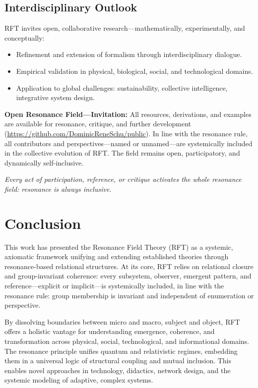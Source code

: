 \documentclass[12pt]{article}
\begin{document}
	\subsection{Interdisciplinary Outlook}
	
	RFT invites open, collaborative research—mathematically, experimentally, and conceptually:
	\begin{itemize}
		\item Refinement and extension of formalism through interdisciplinary dialogue.
		\item Empirical validation in physical, biological, social, and technological domains.
		\item Application to global challenges: sustainability, collective intelligence, integrative system design.
	\end{itemize}
	
	\medskip
	
	\textbf{Open Resonance Field—Invitation:}  
	All resources, derivations, and examples are available for resonance, critique, and further development (\url{https://github.com/DominicReneSchu/public}). In line with the resonance rule, all contributors and perspectives—named or unnamed—are systemically included in the collective evolution of RFT. The field remains open, participatory, and dynamically self-inclusive.
	
	\medskip
	
	\textit{Every act of participation, reference, or critique activates the whole resonance field: resonance is always inclusive.}


	
	\section{Conclusion}
	
	This work has presented the Resonance Field Theory (RFT) as a systemic, axiomatic framework unifying and extending established theories through resonance-based relational structures. At its core, RFT relies on relational closure and group-invariant coherence: every subsystem, observer, emergent pattern, and reference—explicit or implicit—is systemically included, in line with the resonance rule: group membership is invariant and independent of enumeration or perspective.
	
	By dissolving boundaries between micro and macro, subject and object, RFT offers a holistic vantage for understanding emergence, coherence, and transformation across physical, social, technological, and informational domains. The resonance principle unifies quantum and relativistic regimes, embedding them in a universal logic of structural coupling and mutual inclusion. This enables novel approaches in technology, didactics, network design, and the systemic modeling of adaptive, complex systems.
	
\end{document}
